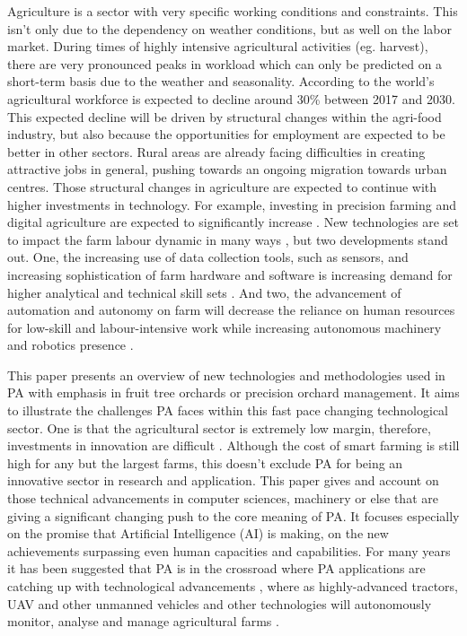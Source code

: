 \documentclass[review]{elsarticle}
\begin{document}
Agriculture is a sector with very specific working conditions and constraints. This isn’t only due to the dependency on weather conditions, but as well on the labor market. During times of highly intensive agricultural activities (eg. harvest), there are very pronounced peaks in workload which can only be predicted on a short-term basis due to the weather and seasonality. According to \cite{EmploymentEU} the world’s agricultural workforce is expected to decline around 30\% between 2017 and 2030. This expected decline will be driven by structural changes within the agri-food industry, but also because the opportunities for employment are expected to be better in other sectors. Rural areas are already facing difficulties in creating attractive jobs in general, pushing towards an ongoing migration towards urban centres. Those structural changes in agriculture are expected to continue with higher investments in technology. For example, investing in precision farming and digital agriculture are expected to significantly increase \cite{Colbert16}. New technologies are set to impact the farm labour dynamic in many ways \cite{Pierpaoli_2013}, but two developments stand out. One, the increasing use of data collection tools, such as sensors, and increasing sophistication of farm hardware and software is increasing demand for higher analytical and technical skill sets \cite{Aubert_2012,Mulla_2013}. And two, the advancement of automation and autonomy on farm will decrease the reliance on human resources for low-skill and labour-intensive work while increasing autonomous machinery and robotics presence \cite{Bechar_2016, Precision2007, Yaghoubi13}.

This paper presents an overview of new technologies and methodologies used in PA with emphasis in fruit tree orchards or precision orchard management. It aims to illustrate the challenges PA faces within this fast pace changing technological sector. One is that the agricultural sector is extremely low margin, therefore, investments in innovation are difficult \cite{Pierpaoli_2013}. Although the cost of smart farming is still high for any but the largest farms, this doesn't exclude PA for being an innovative sector in research and application. This paper gives and account on those technical advancements in computer sciences, machinery or else that are giving a significant changing push to the core meaning of PA. It focuses especially on the promise that Artificial Intelligence (AI) is making, on the new achievements surpassing even human capacities and capabilities. For many years it has been suggested that PA is in the crossroad where PA applications are catching up with technological advancements \cite{Stafford_2000}, where as highly-advanced tractors, UAV and other unmanned vehicles and other technologies will autonomously monitor, analyse and manage agricultural farms \cite{Stafford_2000_book}.
\end{document}

